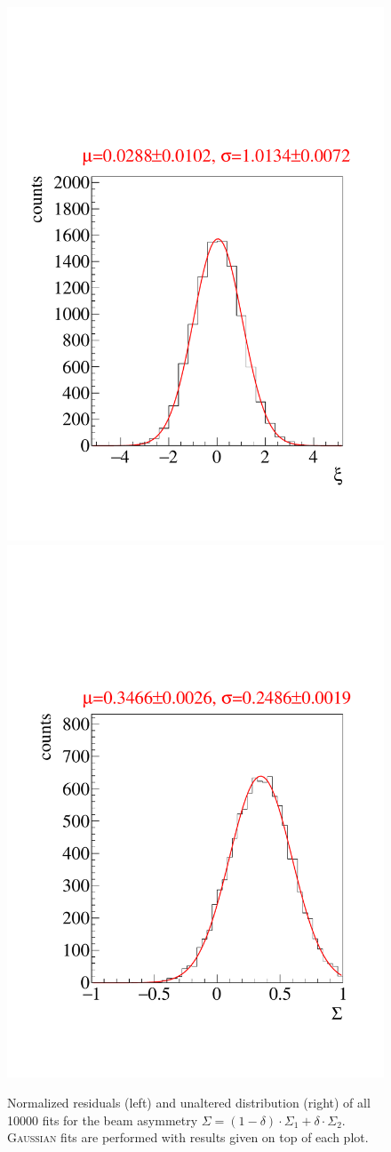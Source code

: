 \begin{figure}[htbp]
	\centering
	\includegraphics[width=.49\linewidth]{../RooFit/plots/residuals.pdf}
	\includegraphics[width=.49\linewidth]{../RooFit/plots/sigma.pdf}
	\caption{Normalized residuals (left) and unaltered distribution (right) of all 10000 fits for the beam asymmetry $\Sigma=(1-\delta)\cdot\Sigma_1+\delta\cdot\Sigma_2$. \textsc{Gaussian} fits are performed with results given on top of each plot.}
	\label{fig:ml_sigma}
\end{figure}
